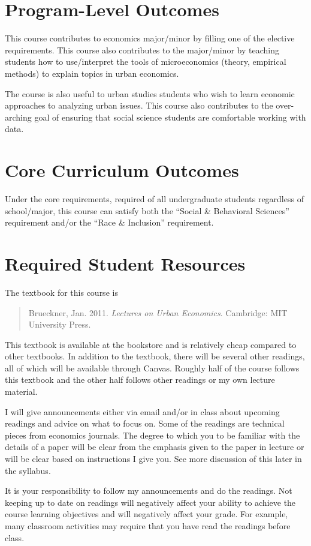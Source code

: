 \documentclass[11pt,letterpaper,final]{article}
\begin{document}
\section{Program-Level Outcomes} This course contributes to economics major/minor by filling one of the elective requirements. This course also contributes to the major/minor by teaching students how to use/interpret the tools of microeconomics (theory, empirical methods) to explain topics in urban economics. 

The course is also useful to urban studies students who wish to learn economic approaches to analyzing urban issues. This course also contributes to the over-arching goal of ensuring that social science students are comfortable working with data.

\section{Core Curriculum Outcomes} Under the core requirements, required of all undergraduate students regardless of school/major, this course can satisfy both the ``Social \& Behavioral Sciences'' requirement and/or the ``Race \& Inclusion'' requirement.

\section{Required Student Resources}
The textbook for this course is
\begin{quote}
	Brueckner, Jan. 2011. {\em Lectures on Urban Economics}. Cambridge: MIT University Press.
\end{quote}
\nocite{Brueckner2011}

This textbook is available at the bookstore and is relatively cheap compared to other textbooks. In addition to the textbook, there will be several other readings, all of which will be available through Canvas. Roughly half of the course follows this textbook and the other half follows other readings or my own lecture material.

I will give announcements either via email and/or in class about upcoming readings and advice on what to focus on. Some of the readings are technical pieces from economics journals. The degree to which you to be familiar with the details of a paper will be clear from the emphasis given to the paper in lecture or will be clear based on instructions I give you. See more discussion of this later in the syllabus. 

It is your responsibility to follow my announcements and do the readings. Not keeping up to date on readings will negatively affect your ability to achieve the course learning objectives and will negatively affect your grade. For example, many classroom activities may require that you have read the readings before class.
\end{document}
